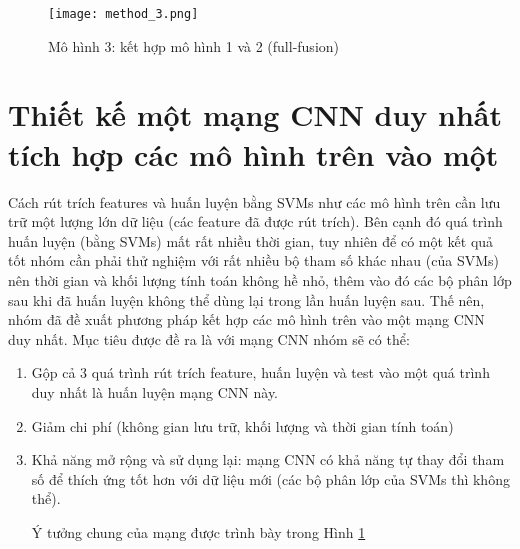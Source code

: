 \begin{figure}[h!]
	\centering
	\captionsetup{width=0.7\textwidth}
	\texttt{[image: method\_3.png]}
	\caption{Mô hình 3: kết hợp mô hình 1 và 2 (full-fusion)}
    \label{fig:method_3}
\end{figure}

\section{Thiết kế một mạng CNN duy nhất tích hợp các mô hình trên vào một}
Cách rút trích features và huấn luyện bằng SVMs như các mô hình trên 
cần lưu trữ một lượng lớn dữ liệu (các feature đã được rút trích). Bên cạnh đó quá trình huấn luyện (bằng SVMs) mất rất nhiều thời gian, tuy nhiên để có một kết quả tốt nhóm cần phải thử nghiệm với rất nhiều bộ tham số khác nhau (của SVMs) nên thời gian và khối lượng tính toán không hề nhỏ, thêm vào đó các bộ phân lớp sau khi đã huấn luyện không thể dùng lại trong lần huấn luyện sau. Thế nên, nhóm đã đề xuất phương pháp kết hợp các mô hình trên vào một mạng CNN duy nhất. Mục tiêu được đề ra là với mạng CNN nhóm sẽ có thể:
\begin{enumerate}
	\item Gộp cả 3 quá trình rút trích feature, huấn luyện và test vào một quá trình duy nhất là huấn luyện mạng CNN này.
	\item Giảm chi phí (không gian lưu trữ, khối lượng và thời gian tính toán)
	\item Khả năng mở rộng và sử dụng lại: mạng CNN có khả năng tự thay đổi tham số để thích ứng tốt hơn với dữ liệu mới (các bộ phân lớp của SVMs thì không thể).
    
Ý tưởng chung của mạng được trình bày trong Hình \ref{}
\end{enumerate}